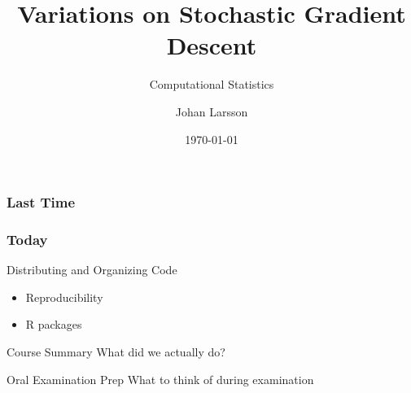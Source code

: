 \documentclass[aspectratio=1610,onlytextwidth]{beamer}
\date{\today}
\title{Variations on Stochastic Gradient Descent}
\subtitle{Computational Statistics}
\author{Johan Larsson}
\institute{Department of Mathematical Sciences, University of Copenhagen}
\begin{document}
\maketitle

%
%

\begin{frame}[c]
  \frametitle{Last Time}

\end{frame}

\begin{frame}[c]
  \frametitle{Today}

  \begin{block}{Distributing and Organizing Code}

    \begin{itemize}
      \item Reproducibility
      \item R packages
    \end{itemize}

  \end{block}

  \pause

  \begin{block}{Course Summary}
    What did we actually do?
  \end{block}

  \pause

  \begin{block}{Oral Examination Prep}
    What to think of during examination
  \end{block}
\end{frame}
\end{document}
